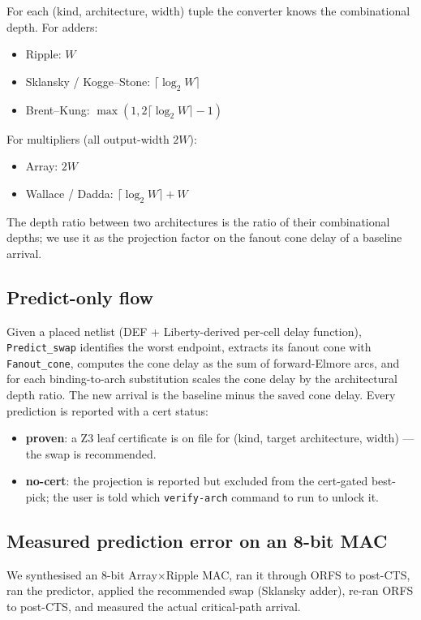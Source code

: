 \documentclass[11pt,a4paper]{article}
\begin{document}
For each (kind, architecture, width) tuple the converter knows the
combinational depth.  For adders:
\begin{itemize}
\item Ripple: $W$
\item Sklansky / Kogge--Stone: $\lceil \log_2 W \rceil$
\item Brent--Kung: $\max(1, 2\lceil \log_2 W \rceil - 1)$
\end{itemize}
For multipliers (all output-width $2W$):
\begin{itemize}
\item Array: $2W$
\item Wallace / Dadda: $\lceil \log_2 W \rceil + W$
\end{itemize}
The depth ratio between two architectures is the ratio of their
combinational depths; we use it as the projection factor on the
fanout cone delay of a baseline arrival.

\subsection{Predict-only flow}

Given a placed netlist (DEF + Liberty-derived per-cell delay
function), \texttt{Predict\_swap} identifies the worst endpoint,
extracts its fanout cone with \texttt{Fanout\_cone}, computes the
cone delay as the sum of forward-Elmore arcs, and for each
binding-to-arch substitution scales the cone delay by the
architectural depth ratio.  The new arrival is the baseline minus
the saved cone delay.  Every prediction is reported with a cert
status:

\begin{itemize}
\item \textbf{proven}: a Z3 leaf certificate is on file for
(kind, target architecture, width) --- the swap is recommended.
\item \textbf{no-cert}: the projection is reported but excluded
from the cert-gated best-pick; the user is told which
\texttt{verify-arch} command to run to unlock it.
\end{itemize}

\subsection{Measured prediction error on an 8-bit MAC}

We synthesised an 8-bit Array$\times$Ripple MAC, ran it through
ORFS to post-CTS, ran the predictor, applied the recommended swap
(Sklansky adder), re-ran ORFS to post-CTS, and measured the actual
critical-path arrival.
\end{document}
